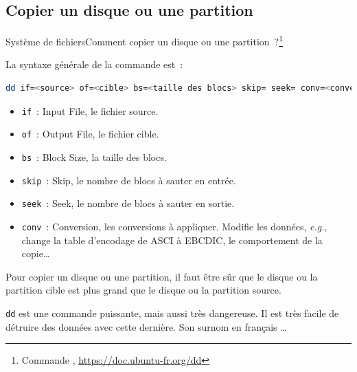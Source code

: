 \documentclass{beamer}
\begin{document}
    \subsection{Copier un disque ou une partition}\label{subsec:dd}

    \begin{frame}[fragile]{Système de fichiers}{Comment copier un disque ou une partition~?\footnote{Commande , \url{https://doc.ubuntu-fr.org/dd}}}
        \begin{footnotesize}
            La syntaxe générale de la commande est~:
            \begin{lstlisting}[language=bash]
dd if=<source> of=<cible> bs=<taille des blocs> skip= seek= conv=<conversion>
            \end{lstlisting}
            \begin{itemize}
                \item \lstinline{if}~: Input File, le fichier source.
                \item \lstinline{of}~: Output File, le fichier cible.
                \item \lstinline{bs}~: Block Size, la taille des blocs.
                \item \lstinline{skip}~: Skip, le nombre de blocs à sauter en entrée.
                \item \lstinline{seek}~: Seek, le nombre de blocs à sauter en sortie.
                \item \lstinline{conv}~: Conversion, les conversions à appliquer.
                Modifie les données, \textit{e.g.}, change la table d'encodage de ASCI à EBCDIC, le comportement de la copie\ldots
            \end{itemize}
            Pour copier un disque ou une partition, il faut être sûr que le disque ou la partition cible est plus grand que le disque ou la partition source.
            \begin{dangercolorbox}
                \lstinline{dd} est une commande puissante, mais aussi très dangereuse.
                Il est très facile de détruire des données avec cette dernière.
                Son surnom en français \ldots
            \end{dangercolorbox}
        \end{footnotesize}
    \end{frame}
\end{document}
